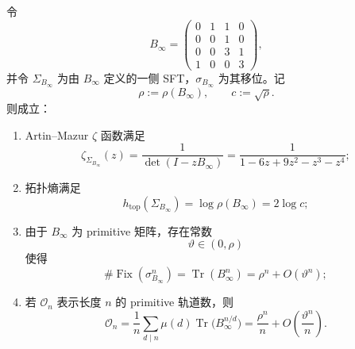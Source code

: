 \begin{theorem}\label{thm:conclusion-realinput40-zero-temp-fourstate-sft-closed-zeta}
令
\[
B_\infty=
\begin{pmatrix}
0&1&1&0\\
0&0&1&0\\
0&0&3&1\\
1&0&0&3
\end{pmatrix},
\]
并令 \(\Sigma_{B_\infty}\) 为由 \(B_\infty\) 定义的一侧 SFT，\(\sigma_{B_\infty}\) 为其移位。记
\[
\rho:=\rho(B_\infty),
\qquad
c:=\sqrt{\rho}.
\]
则成立：
\begin{enumerate}
  \item Artin--Mazur \(\zeta\) 函数满足
  \[
  \zeta_{\Sigma_{B_\infty}}(z)
  =
  \frac{1}{\det(I-zB_\infty)}
  =
  \frac{1}{1-6z+9z^2-z^3-z^4};
  \]
  \item 拓扑熵满足
  \[
  h_{\mathrm{top}}(\Sigma_{B_\infty})=\log\rho(B_\infty)=2\log c;
  \]
  \item 由于 \(B_\infty\) 为 primitive 矩阵，存在常数
  \[
  \vartheta\in(0,\rho)
  \]
  使得
  \[
  \#\operatorname{Fix}(\sigma_{B_\infty}^n)
  =
  \operatorname{Tr}(B_\infty^n)
  =
  \rho^n+O(\vartheta^n);
  \]
  \item 若 \(\mathcal O_n\) 表示长度 \(n\) 的 primitive 轨道数，则
  \[
  \mathcal O_n
  =
  \frac{1}{n}\sum_{d\mid n}\mu(d)\operatorname{Tr}\!\bigl(B_\infty^{n/d}\bigr)
  =
  \frac{\rho^n}{n}+O\!\left(\frac{\vartheta^n}{n}\right).
  \]
\end{enumerate}
\end{theorem}
